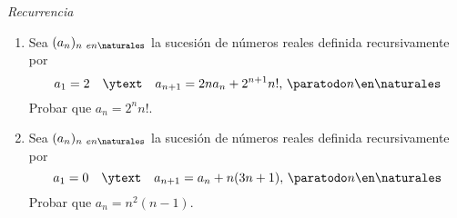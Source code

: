 \separador

\textit{Recurrencia}

\begin{enunciado}{\ejercicio}
  \begin{enumerate}[label=\roman*)]
    \item
          Sea $(a_n)_{n\ en \naturales}$ la sucesión de números reales definida recursivamente por
          $$
            a_1 = 2 \quad\ytext\quad a_{n+1} = 2 n a_n+ 2^{n+1}n!,\, \paratodo n \en \naturales
          $$
          Probar que $a_n = 2^n n!$.

    \item
          Sea $(a_n)_{n\ en \naturales}$ la sucesión de números reales definida recursivamente por
          $$
            a_1 = 0 \quad\ytext\quad a_{n+1} = a_n + n(3n + 1),\, \paratodo n \en \naturales
          $$
          Probar que $a_n = n^2 (n-1)$.
  \end{enumerate}
\end{enunciado}

